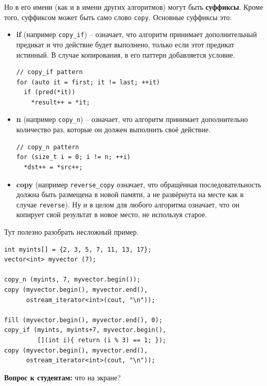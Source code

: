 \documentclass[a4paper,12pt,oneside]{book}
\newif\ifanswers
\begin{document}
Но в его имени (как и в имени других алгоритмов) могут быть \textbf{суффиксы}. Кроме того, суффиксом может быть само слово \lstinline!copy!. Основные суффиксы это:

\begin{itemize}
\item \textbf{if} (например \lstinline!copy_if!) -- означает, что алгоритм принимает дополнительный предикат и что действие будет выполнено, только если этот предикат истинный. В случае копирования, в его паттерн добавляется условие.

\begin{lstlisting}
// copy_if pattern
for (auto it = first; it != last; ++it)
  if (pred(*it))
    *result++ = *it;
\end{lstlisting}

\item \textbf{n} (например \lstinline!copy_n!) -- означает, что алгоритм принимает дополнительно количество раз, которые он должен выполнить своё действие.

\begin{lstlisting}
// copy_n pattern
for (size_t i = 0; i != n; ++i)
  *dst++ = *src++;
\end{lstlisting}

\item \textbf{copy} (например \lstinline!reverse_copy! означает, что обращённая последовательность должна быть размещена в новой памяти, а не развёрнута на месте как в случае \lstinline!reverse!). Ну и в целом для любого алгоритма означает, что он копирует свой результат в новое место, не используя старое.
\end{itemize}

Тут полезно разобрать несложный пример.

\begin{lstlisting}
int myints[] = {2, 3, 5, 7, 11, 13, 17}; 
vector<int> myvector (7);

copy_n (myints, 7, myvector.begin());
copy (myvector.begin(), myvector.end(), 
      ostream_iterator<int>(cout, "\n"));

fill (myvector.begin(), myvector.end(), 0);
copy_if (myints, myints+7, myvector.begin(), 
         [](int i){ return (i % 3) == 1; });
copy (myvector.begin(), myvector.end(), 
      ostream_iterator<int>(cout, "\n"));
\end{lstlisting}

\textbf{Вопрос к студентам:} что на экране?

\ifanswers
Сначала будут выведены через перевод строки все числа 2, 3, 5, 7, 11, 13, 17, а потом, тоже через перевод строки, будут выведены числа 7, 13, 0, 0, 0, 0, 0, поскольку только эти два числа из перечисленных дают 1 в остатке от деления на 3.
\fi
\end{document}

